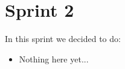 \chapter{Sprint 2}

In this sprint we decided to do:

\begin{itemize}
 \item Nothing here yet... 
\end{itemize}




